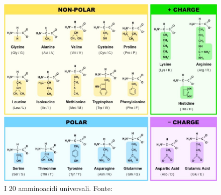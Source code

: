 \begin{figure}[h]
	\centering
	\includegraphics[scale=0.4]{images/aminoacid-tipi.jpeg}
	\caption{I 20 amminoacidi universali. Fonte: \cite{aminoacidTipi}}
	\label{fig:amminoacidi-tipi}
\end{figure}

\clearpage